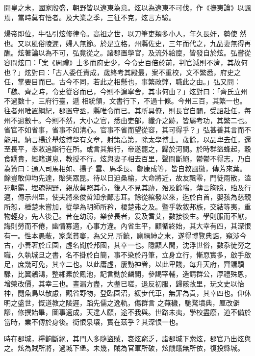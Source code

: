 \begin{pinyinscope}
 開皇之末，國家殷盛，朝野皆以遼東為意。炫以為遼東不可伐，作《撫夷論》以諷焉，當時莫有悟者。及大業之季，三征不克，炫言方驗。



 煬帝即位，牛弘引炫修律令。高祖之世，以刀筆吏類多小人，年久長奸，勢使
 然也。又以風俗陵遲，婦人無節。於是立格，州縣佐史，三年而代之，九品妻無得再醮。炫著論以為不可，弘竟從之。諸郡置學官，及流外給廩，皆發自於炫。弘嘗從容問炫曰：「案《周禮》士多而府史少，今令史百倍於前，判官減則不濟，其故何也？」炫對曰：「古人委任責成，歲終考其殿最，案不重校，文不繁悉，府史之任，掌要目而已。古今不同，若此之相懸也，事繁政弊，職此之由。」弘又問：「魏、齊之時，令史從容而已，今則不遑寧舍，其事何由？」炫對曰：「齊氏立州不過數十，三府行臺，遞
 相統領，文書行下，不過十條。今州三百，其繁一也。往者州唯置綱紀，郡置守丞，縣唯令而已。其所具僚，則長官自闢，受詔赴任，每州不過數十。今則不然，大小之官，悉由吏部，纖介之跡，皆屬考功，其繁二也。省官不如省事，省事不如清心。官事不省而望從容，其可得乎？」弘甚善其言而不能用。納言楊達舉炫博學有文章，射策高第，除太學博士。歲餘，以品卑去任，還至長平，奉敕追詣行在所。或言其無行，帝遂罷之，歸於河間。於時群盜蜂起，穀食踴貴，經籍道息，教授不行。炫與妻子相去百里，聲問斷絕，鬱鬱不得志，乃自為贊曰：通人司馬相如、揚子
 雲、馬季長、鄭康成等，皆自敘風徽，傳芳來葉。餘豈敢仰均先達，貽笑眾昆。待以日迫桑榆，大命將近，故友飄零，門徒雨散，溘死朝露，埋魂朔野，親故莫照其心，後人不見其跡，殆及餘喘，薄言胸臆，貽及行邁，傳示州里，使夫將來俊哲知余鄙志耳。餘從綰發以來，迄於白首，嬰孩為慈親所恕，棰楚未嘗加，從學為明師所矜，榎楚弗之及。暨乎敦敘邦族，交結等夷，重物輕身，先人後己。昔在幼弱，樂參長者，爰及耆艾，數接後生。學則服而不厭，誨則勞而不倦，幽情寡適，心事方違。內省生平，顧循終始，其大幸有四，其深恨有一。性本愚蔽，家業貧窶，為父兄
 所饒，廁縉紳之末，遂得博覽典誥，窺涉今古，小善著於丘園，虛名聞於邦國，其幸一也。隱顯人間，沈浮世俗，數忝徒勞之職，久執城旦之書，名不掛於白簡，事不染於丹筆，立身立行，慚恧實多，啟手啟足，庶幾可免，其幸二也。以此庸虛，屢動神眷，以此卑賤，每升天府，齊鑣驥騄，比翼鵷鴻，整緗素於鳳池，記言動於麟閣，參謁宰輔，造請群公，厚禮殊恩，增榮改價，其幸三也。晝漏方盡，大耋已嗟，退反初服，歸骸故里，玩文史以怡神，閱魚鳥以散慮，觀省野物，登臨園沼，緩步代車，無罪為貴，其幸四也。仰休明之盛世，慨道教之陵遲，蹈先儒之逸軌，傷群言
 之蕪穢，馳騖墳典，厘改僻謬，修撰始畢，圖事適成，天違人願，途不我與。世路未夷，學校盡廢，道不備於當時，業不傳於身後。銜恨泉壤，實在茲乎？其深恨一也。



 時在郡城，糧餉斷絕，其門人多隨盜賊，哀炫窮乏，詣郡城下索炫，郡官乃出炫與之。炫為賊所將，過城下堡。未幾，賊為官軍所破，炫饑餓無所依，復投縣城。




\end{pinyinscope}
